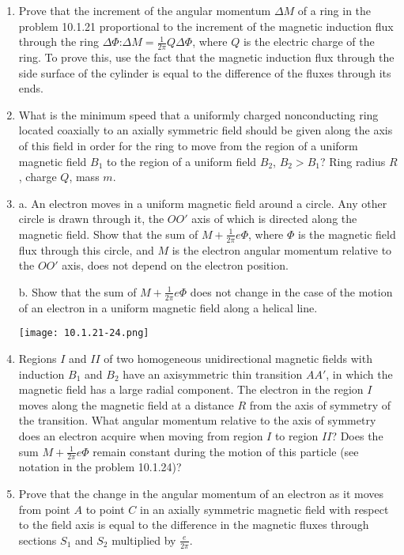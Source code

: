 \documentclass{article}
\begin{document}
\begin{enumerate}[label=10.1.\arabic*]
\item Prove that the increment of the angular momentum $\Delta M$ of a ring in the problem 10.1.21 proportional to the increment of the magnetic induction flux through the ring $\Delta \Phi$:$ \Delta M = \frac{1}{2 \pi} Q \Delta \Phi$, where $Q$ is the electric charge of the ring. To prove this, use the fact that the magnetic induction flux through the side surface of the cylinder is equal to the difference of the fluxes through its ends.

\item What is the minimum speed that a uniformly charged nonconducting ring located coaxially to an axially symmetric field should be given along the axis of this field in order for the ring to move from the region of a uniform magnetic field $B_1$ to the region of a uniform field $B_2$, $B_2 > B_1$? Ring radius $R$, charge $Q$, mass $m$.

\item a. An electron moves in a uniform magnetic field around a circle. Any other circle is drawn through it, the $OO'$ axis of which is directed along the magnetic field. Show that the sum of $M + \frac{1}{2\pi} e \Phi$, where $\Phi$ is the magnetic field flux through this circle, and $M$ is the electron angular momentum relative to the $OO'$ axis, does not depend on the electron position. 

b. Show that the sum of $M + \frac{1}{2\pi} e \Phi$ does not change in the case of the motion of an electron in a uniform magnetic field along a helical line.

\begin{center}
    \texttt{[image: 10.1.21-24.png]}
\end{center}

\item Regions $I$ and $II$ of two homogeneous unidirectional magnetic fields with induction $B_1$ and $B_2$ have an axisymmetric thin transition $AA'$, in which the magnetic field has a large radial component. The electron in the region $I$ moves along the magnetic field at a distance $R$ from the axis of symmetry of the transition. What angular momentum relative to the axis of symmetry does an electron acquire when moving from region $I$ to region $II$? Does the sum $M + \frac{1}{2\pi} e \Phi$ remain constant during the motion of this particle (see notation in the problem 10.1.24)?

\item Prove that the change in the angular momentum of an electron as it moves from point $A$ to point $C$ in an axially symmetric magnetic field with respect to the field axis is equal to the difference in the magnetic fluxes through sections $S_1$ and $S_2$ multiplied by $\frac{e}{2 \pi}$.


\end{enumerate}
\end{document}
